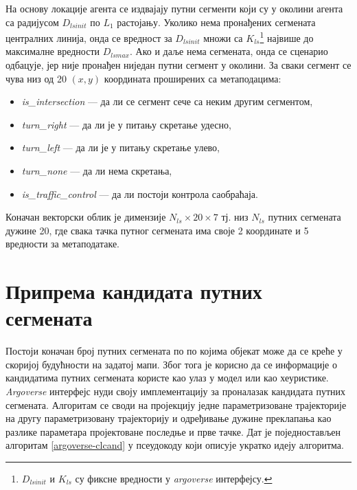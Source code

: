 \documentclass[11pt,oneside]{memoir}
\begin{document}
На основу локације агента се издвајају путни сегменти који су у околини агента са радијусом $D_{lsinit}$ по $L_1$ растојању. 
Уколико нема пронађених сегмената централних линија, онда се вредност за $D_{lsinit}$ множи са $K_{ls}$\footnote{$D_{lsinit}$ и $K_{ls}$ су фиксне вредности
у \textit{argoverse} интерфејсу.} највише до максималне вредности $D_{lsmax}$. Ако и даље нема сегмената, 
онда се сценарио одбацује, јер није пронађен ниједан путни сегмент у околини. 
За сваки сегмент се чува низ од 20 $(x, y)$ координата проширених са метаподацима:
\begin{itemize} 
  \item \textit{is\_intersection} --- да ли се сегмент сече са неким другим сегментом,
  \item \textit{turn\_right} --- да ли је у питању скретање удесно, 
  \item \textit{turn\_left} --- да ли је у питању скретање улево, 
  \item \textit{turn\_none} --- да ли нема скретања, 
  \item \textit{is\_traffic\_control} --- да ли постоји контрола саобраћаја. 
\end{itemize}
Коначан векторски облик је димензије $N_{ls}\times 20\times 7$ тј. низ $N_{ls}$ путних сегмената дужине 20, где свака тачка путног сегмената има своје 2 координате
и 5 вредности за метаподатаке. 

\section{Припрема кандидата путних сегмената}

Постоји коначан број путних сегмената по по којима
објекат може да се креће у скоријој будућности на задатој мапи. Због тога је корисно да се информације о кандидатима путних сегмената
користе као улаз у модел или као хеуристике.
\textit{Argoverse} интерфејс нуди своју имплементацију
за проналазак кандидата путних сегмената. Алгоритам се своди на пројекцију једне параметризоване трајекторије на другу параметризовану трајекторију и 
одређивање дужине преклапања као разлике параметара пројектоване последње и прве тачке. Дат је поједностављен алгоритам \ref{argoverse-clcand} у 
псеудокоду који описује укратко идеју алгоритма.
\end{document}
